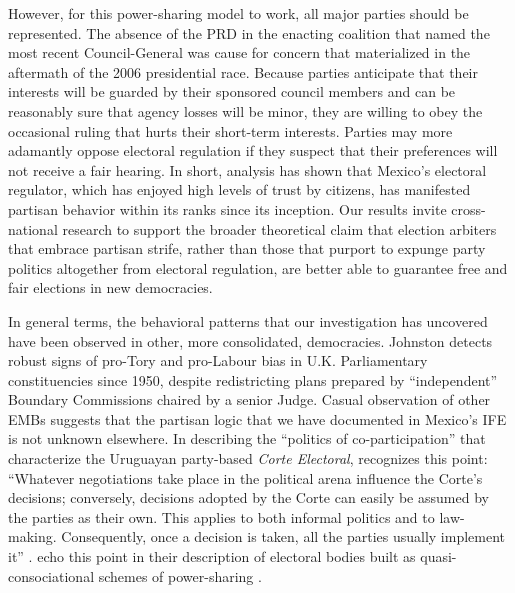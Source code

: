\documentclass[12 pt, letter]{article}
\begin{document}
However, for this power-sharing model to work, all major parties should be represented. The absence of the PRD in the enacting coalition that named the most recent Council-General was cause for concern that materialized in the aftermath of the 2006 presidential race. Because parties anticipate that their interests will be guarded by their sponsored council members and can be reasonably sure that agency losses will be minor, they are willing to obey the occasional ruling that hurts their short-term interests. Parties may more adamantly oppose electoral regulation if they suspect that their preferences will not receive a fair hearing. In short, analysis has shown that Mexico's electoral regulator, which has enjoyed high levels of trust by citizens, has manifested partisan behavior within its ranks since its inception.   Our results invite cross-national research to support the broader theoretical claim that election arbiters that embrace partisan strife, rather than those that purport to expunge party politics altogether from electoral regulation, are better able to guarantee free and fair elections in new democracies.

In general terms, the behavioral patterns that our investigation has uncovered have been observed in other, more consolidated, democracies.  Johnston \citeyearpar{Johnston2002} detects robust signs of pro-Tory and pro-Labour bias in U.K. Parliamentary constituencies since 1950, despite redistricting plans prepared by ``independent'' Boundary Commissions chaired by a senior Judge. Casual observation of other EMBs suggests that the partisan logic that we have documented in Mexico's IFE is not unknown elsewhere. In describing the ``politics of co-participation'' that characterize the Uruguayan party-based \emph{Corte Electoral}, \citeauthor{LopezPintor2000} recognizes this point: ``Whatever negotiations take place in the political arena influence the Corte's decisions; conversely, decisions adopted by the Corte can easily be assumed by the parties as their own. This applies to both informal politics and to law-making. Consequently, once a decision is taken, all the parties usually implement it'' \citep[p.  23]{LopezPintor2000}. \citeauthor{Mozaffar2002a} echo this point in their description of electoral bodies built as quasi-consociational schemes of power-sharing \citep[p. 16]{Mozaffar2002a}.
\end{document}
